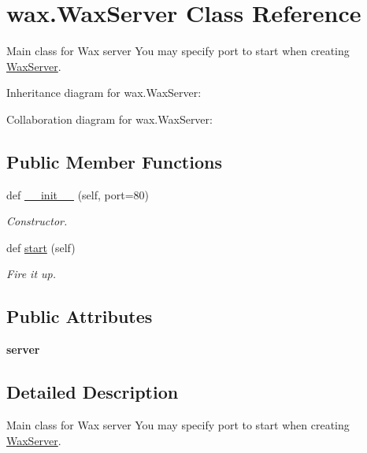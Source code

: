 \hypertarget{classwax_1_1WaxServer}{}\section{wax.\+Wax\+Server Class Reference}
\label{classwax_1_1WaxServer}


Main class for Wax server You may specify port to start when creating \hyperlink{classwax_1_1WaxServer}{Wax\+Server}.  




Inheritance diagram for wax.\+Wax\+Server\+:


Collaboration diagram for wax.\+Wax\+Server\+:
\subsection*{Public Member Functions}
\begin{DoxyCompactItemize}
\item 
def \hyperlink{classwax_1_1WaxServer_a252b25c8fd1c378d989eb16c7014091c}{\+\_\+\+\_\+init\+\_\+\+\_\+} (self, port=80)
\begin{DoxyCompactList}\small\item\em Constructor. \end{DoxyCompactList}\item 
def \hyperlink{classwax_1_1WaxServer_a359002811fd01de7fb3a902746f8c95d}{start} (self)\hypertarget{classwax_1_1WaxServer_a359002811fd01de7fb3a902746f8c95d}{}\label{classwax_1_1WaxServer_a359002811fd01de7fb3a902746f8c95d}

\begin{DoxyCompactList}\small\item\em Fire it up. \end{DoxyCompactList}\end{DoxyCompactItemize}
\subsection*{Public Attributes}
\begin{DoxyCompactItemize}
\item 
{\bfseries server}\hypertarget{classwax_1_1WaxServer_ac8b47f7cc453ba045d048b02c3b4bd73}{}\label{classwax_1_1WaxServer_ac8b47f7cc453ba045d048b02c3b4bd73}

\end{DoxyCompactItemize}


\subsection{Detailed Description}
Main class for Wax server You may specify port to start when creating \hyperlink{classwax_1_1WaxServer}{Wax\+Server}. 

